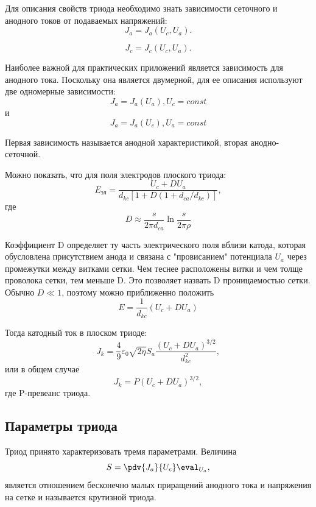 Для описания свойств триода необходимо знать зависимости сеточного и анодного токов от подаваемых напряжений:
\begin{equation}
	J_a=J_a (U_c,U_a).
\end{equation}

\begin{equation}
	J_c=J_c (U_c,U_a).
\end{equation}

Наиболее важной для практических приложений является зависимость для анодного тока. Поскольку она является двумерной, для ее описания используют две одномерные зависимости:
\begin{equation}
	J_a=J_a (U_a), U_c=const
\end{equation}
и
\begin{equation}
	J_a=J_a (U_c), U_a=const
\end{equation}

Первая зависимость называется анодной характеристикой, вторая анодно-сеточной.

Можно показать, что для поля электродов плоского триода:
\begin{equation}
	E_{\text{эл}} = \frac{U_c+DU_a}{d_{kc}[1+D(1+d_{ca}/d_{kc})]},
\end{equation}
где 
\begin{equation}
	D \approx \frac{s}{2\pi d_{ca}}\ln{\frac{s}{2\pi \rho}}
\end{equation}

Коэффициент D определяет ту часть электрического поля вблизи катода, которая обусловлена присутствием анода и связана с "провисанием" потенциала $U_a$ через промежутки между витками сетки. Чем теснее расположены витки и чем толще проволока сетки, тем меньше D. Это позволяет назвать D проницаемостью сетки. Обычно $D \ll 1$, поэтому можно приближенно положить
\begin{equation}
	E = \frac{1}{d_{kc}}(U_c+DU_a)
\end{equation}

Тогда катодный ток в плоском триоде:
\begin{equation}
J_k=\frac49 \varepsilon_0 \sqrt{2 \eta} S_a \frac{(U_c+DU_a)^{3/2}}{d_{kc}^2}, 
\end{equation}
или в общем случае
\begin{equation}
J_k=P(U_c+DU_a)^{3/2}, 
\end{equation}
где  P-превеанс триода.

\subsection{Параметры триода}
Триод принято характеризовать тремя параметрами. Величина
\begin{equation}
	S= \pdv{J_a}{U_c} \eval _{U_a}, 
\end{equation}
является отношением бесконечно малых приращений анодного тока и напряжения на сетке и называется крутизной триода. 


